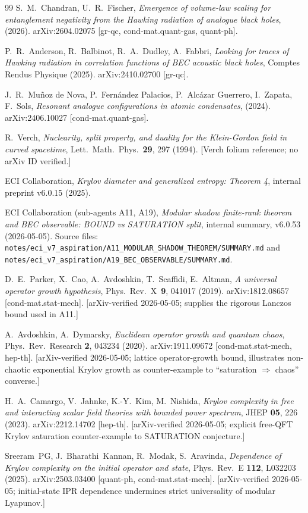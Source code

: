 \documentclass[12pt,a4paper]{article}
\begin{document}
\begin{thebibliography}{99}
S.~M.~Chandran, U.~R.~Fischer,
\emph{Emergence of volume-law scaling for entanglement negativity from the Hawking radiation of analogue black holes},
(2026).
arXiv:2604.02075 [gr-qc, cond-mat.quant-gas, quant-ph].

P.~R.~Anderson, R.~Balbinot, R.~A.~Dudley, A.~Fabbri,
\emph{Looking for traces of Hawking radiation in correlation functions of BEC acoustic black holes},
Comptes Rendus Physique (2025).
arXiv:2410.02700 [gr-qc].

J.~R.~Mu{\~n}oz de Nova, P.~Fern\'andez Palacios, P.~Alc\'azar Guerrero, I.~Zapata, F.~Sols,
\emph{Resonant analogue configurations in atomic condensates},
(2024).
arXiv:2406.10027 [cond-mat.quant-gas].

R.~Verch,
\emph{Nuclearity, split property, and duality for the Klein-Gordon field in curved spacetime},
Lett.\ Math.\ Phys.\ \textbf{29}, 297 (1994).
[Verch folium reference; no arXiv ID verified.]

ECI Collaboration,
\emph{Krylov diameter and generalized entropy: Theorem 4},
internal preprint v6.0.15 (2025).

ECI Collaboration (sub-agents A11, A19),
\emph{Modular shadow finite-rank theorem and BEC observable:
BOUND vs SATURATION split},
internal summary, v6.0.53 (2026-05-05).
Source files:
\texttt{notes/eci\_v7\_aspiration/A11\_MODULAR\_SHADOW\_THEOREM/SUMMARY.md}
and
\texttt{notes/eci\_v7\_aspiration/A19\_BEC\_OBSERVABLE/SUMMARY.md}.

D.~E.~Parker, X.~Cao, A.~Avdoshkin, T.~Scaffidi, E.~Altman,
\emph{A universal operator growth hypothesis},
Phys.\ Rev.\ X~\textbf{9}, 041017 (2019).
arXiv:1812.08657 [cond-mat.stat-mech].
[arXiv-verified 2026-05-05; supplies the rigorous Lanczos bound used in A11.]

A.~Avdoshkin, A.~Dymarsky,
\emph{Euclidean operator growth and quantum chaos},
Phys.\ Rev.\ Research \textbf{2}, 043234 (2020).
arXiv:1911.09672 [cond-mat.stat-mech, hep-th].
[arXiv-verified 2026-05-05; lattice operator-growth bound, illustrates
non-chaotic exponential Krylov growth as counter-example to
``saturation $\Rightarrow$ chaos'' converse.]

H.~A.~Camargo, V.~Jahnke, K.-Y.~Kim, M.~Nishida,
\emph{Krylov complexity in free and interacting scalar field theories
with bounded power spectrum},
JHEP \textbf{05}, 226 (2023).
arXiv:2212.14702 [hep-th].
[arXiv-verified 2026-05-05; explicit free-QFT Krylov saturation
counter-example to SATURATION conjecture.]

Sreeram~PG, J.~Bharathi~Kannan, R.~Modak, S.~Aravinda,
\emph{Dependence of Krylov complexity on the initial operator and state},
Phys.\ Rev.\ E \textbf{112}, L032203 (2025).
arXiv:2503.03400 [quant-ph, cond-mat.stat-mech].
[arXiv-verified 2026-05-05; initial-state IPR dependence undermines
strict universality of modular Lyapunov.]

\end{thebibliography}
\end{document}
